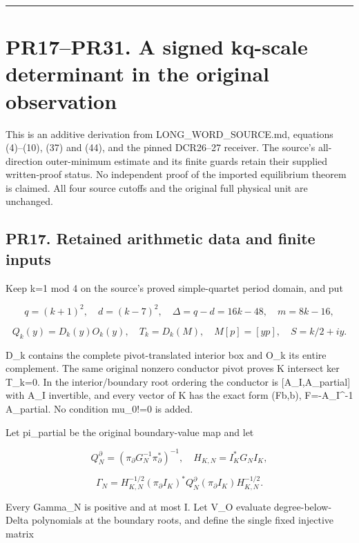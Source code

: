 \documentclass[11pt]{article}
\begin{document}
\begin{center}\rule{0.5\linewidth}{0.5pt}\end{center}

\section{PR17--PR31. A signed kq-scale determinant in the original observation}\label{pr17pr31.-a-signed-kq-scale-determinant-in-the-original-observation}

This is an additive derivation from LONG\_WORD\_SOURCE.md, equations (4)--(10), (37) and (44), and the pinned DCR26--27 receiver. The source's all-direction outer-minimum estimate and its finite guards retain their supplied written-proof status. No independent proof of the imported equilibrium theorem is claimed. All four source cutoffs and the original full physical unit are unchanged.

\subsection{PR17. Retained arithmetic data and finite inputs}\label{pr17.-retained-arithmetic-data-and-finite-inputs}

Keep k=1 mod 4 on the source's proved simple-quartet period domain, and put

\[
q=(k+1)^2,\quad d=(k-7)^2,\quad\Delta=q-d=16k-48,\quad m=8k-16,
\]

\[
Q_k(y)=D_k(y)O_k(y),\quad T_k=D_k(M),\quad M[p]=[yp],\quad S=k/2+iy.
\]

D\_k contains the complete pivot-translated interior box and O\_k its entire complement. The same original nonzero conductor pivot proves K intersect ker T\_k=0. In the interior/boundary root ordering the conductor is {[}A\_I,A\_partial{]} with A\_I invertible, and every vector of K has the exact form (Fb,b), F=-A\_I\^{}-1 A\_partial. No condition mu\_0!=0 is added.

Let pi\_partial be the original boundary-value map and let

\[
Q_N^\partial=(\pi_\partial G_N^{-1}\pi_\partial^*)^{-1},\quad
H_{K,N}=I_K^*G_NI_K,
\]

\[
\Gamma_N=H_{K,N}^{-1/2}
(\pi_\partial I_K)^*Q_N^\partial(\pi_\partial I_K)H_{K,N}^{-1/2}.
\tag{PR17}
\]

Every Gamma\_N is positive and at most I. Let V\_O evaluate degree-below-Delta polynomials at the boundary roots, and define the single fixed injective matrix
\end{document}
